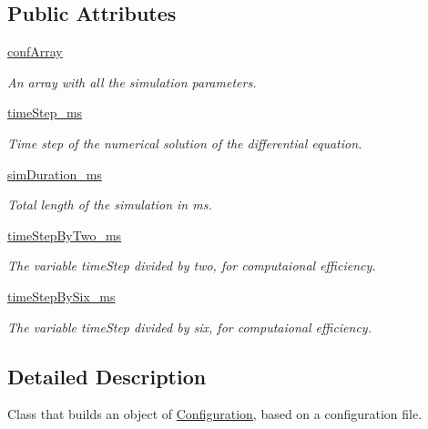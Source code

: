 \subsection*{Public Attributes}
\begin{DoxyCompactItemize}
\item 
\hyperlink{class_configuration_1_1_configuration_a2b8c2d210ef82ba5088de3c8c9a8725d}{conf\-Array}
\begin{DoxyCompactList}\small\item\em An array with all the simulation parameters. \end{DoxyCompactList}\item 
\hyperlink{class_configuration_1_1_configuration_a6379aaa6e54523ca81e3713d1846679b}{time\-Step\-\_\-ms}
\begin{DoxyCompactList}\small\item\em Time step of the numerical solution of the differential equation. \end{DoxyCompactList}\item 
\hyperlink{class_configuration_1_1_configuration_aea238884fe3daa1287aa069f35d4ad3e}{sim\-Duration\-\_\-ms}
\begin{DoxyCompactList}\small\item\em Total length of the simulation in ms. \end{DoxyCompactList}\item 
\hyperlink{class_configuration_1_1_configuration_a58f6e3bf5491f8fb229697fc3690aa12}{time\-Step\-By\-Two\-\_\-ms}
\begin{DoxyCompactList}\small\item\em The variable time\-Step divided by two, for computaional efficiency. \end{DoxyCompactList}\item 
\hyperlink{class_configuration_1_1_configuration_aa49387a016f5d528136ab5812821cb99}{time\-Step\-By\-Six\-\_\-ms}
\begin{DoxyCompactList}\small\item\em The variable time\-Step divided by six, for computaional efficiency. \end{DoxyCompactList}\end{DoxyCompactItemize}


\subsection{Detailed Description}
Class that builds an object of \hyperlink{class_configuration_1_1_configuration}{Configuration}, based on a configuration file. 

